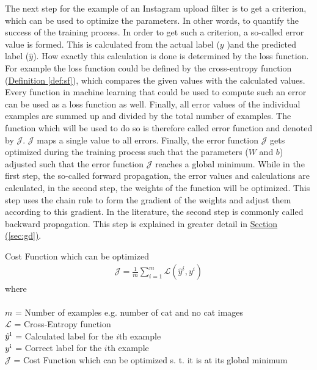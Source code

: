 The next step for the example of an Instagram upload filter is to get a criterion, which can be used to optimize the parameters. In other words, to quantify the success of the training process. In order to get such a criterion, a so-called error value is formed. This is calculated from the actual label (\(y\) )and the predicted label (\( \hat{y} \)). How exactly this calculation is done is determined by the loss function. For example the loss function could be defined by the cross-entropy function (\hyperref[def:cost_function]{Definition \ref{def:sf}}), which compares the given values with the calculated values. Every function in machine learning that could be used to compute such an error can be used as a loss function as well. Finally, all error values of the individual examples are summed up and divided by the total number of examples. The function which will be used to do so is therefore called error function and denoted by \(\mathcal{J}\). \(\mathcal{J}\) maps a single value to all errors. Finally, the error function \(\mathcal{J}\) gets optimized during the training process such that the parameters (\( W \) and \( b \)) adjusted such that the error function \(\mathcal{J}\) reaches a global minimum. While in the first step, the so-called forward propagation, the error values and calculations are calculated, in the second step, the weights of the function will be optimized. This step uses the chain rule to form the gradient of the weights and adjust them according to this gradient. In the literature, the second step is commonly called backward propagation. This step is explained in greater detail in \hyperref[sec:gd]{Section (\ref{sec:gd})}. 

\begin{definition}[label=def:cost_function]{Cost Function which can be optimized}
	\begin{align*}
		\mathcal{J} = \frac{1}{m} \sum_{i=1}^m \mathcal{L}(\hat{y}^{i}, y^{i})
	\end{align*}
	where \\\\
	\(m\)  = Number of examples e.g. number of cat and no cat images \\
	\(\mathcal{L}\) = Cross-Entropy function \\
	\(\hat{y}\textsuperscript{i}\) = Calculated label for the \(i\)th example\\
	\(y\textsuperscript{i}\)     = Correct label for the \(i\)th  example\\
	\(    \mathcal{J} \) = Cost Function which can be optimized s. t. it is at its global minimum
\end{definition}

